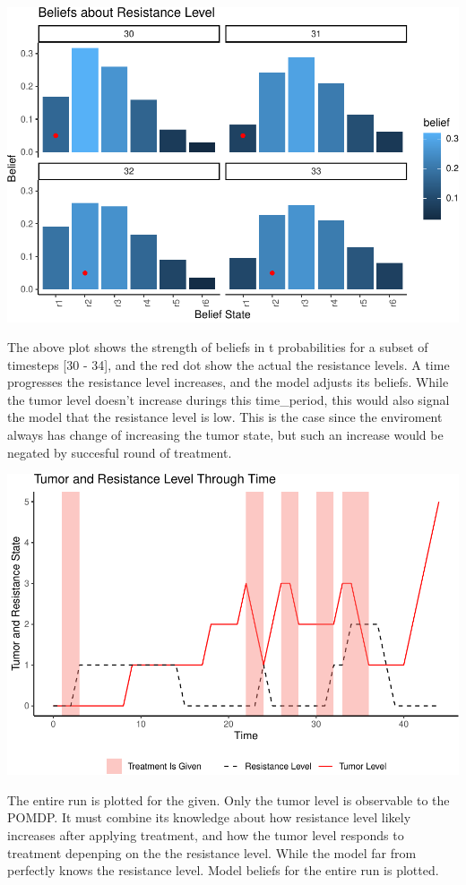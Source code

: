 \documentclass[notspecified,article,submit,moreauthors,pdftex]{Definitions/mdpi}
\begin{document}
\includegraphics{SocultPaper_files/figure-latex/unnamed-chunk-4-1.pdf}

The above plot shows the strength of beliefs in t probabilities for a
subset of timesteps {[}30 - 34{]}, and the red dot show the actual the
resistance levels. A time progresses the resistance level increases, and
the model adjusts its beliefs. While the tumor level doesn't increase
durings this time\_period, this would also signal the model that the
resistance level is low. This is the case since the enviroment always
has change of increasing the tumor state, but such an increase would be
negated by succesful round of treatment.

\includegraphics{SocultPaper_files/figure-latex/unnamed-chunk-5-1.pdf}

The entire run is plotted for the given. Only the tumor level is
observable to the POMDP. It must combine its knowledge about how
resistance level likely increases after applying treatment, and how the
tumor level responds to treatment depenping on the the resistance level.
While the model far from perfectly knows the resistance level. Model
beliefs for the entire run is plotted.
\end{document}
